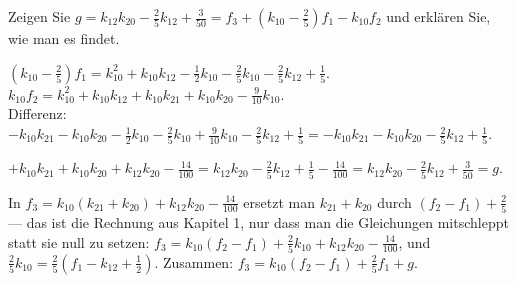 \begin{aufgabe}
Zeigen Sie $g = k_{12}k_{20} - \tfrac25k_{12} + \tfrac{3}{50} = f_3 + (k_{10} - \tfrac25)f_1 - k_{10}f_2$ und erklären Sie, wie man es findet.

\loesung
{}
$(k_{10} - \tfrac25)f_1 = k_{10}^{2} + k_{10}k_{12} - \tfrac12k_{10} - \tfrac25k_{10} - \tfrac25k_{12} + \tfrac15$.\\
$k_{10}f_2 = k_{10}^{2} + k_{10}k_{12} + k_{10}k_{21} + k_{10}k_{20} - \tfrac{9}{10}k_{10}$.\\
Differenz: $-k_{10}k_{21} - k_{10}k_{20} - \tfrac12k_{10} - \tfrac25k_{10} + \tfrac{9}{10}k_{10} - \tfrac25k_{12} + \tfrac15 = -k_{10}k_{21} - k_{10}k_{20} - \tfrac25k_{12} + \tfrac15$.

$+ k_{10}k_{21} + k_{10}k_{20} + k_{12}k_{20} - \tfrac{14}{100} = k_{12}k_{20} - \tfrac25k_{12} + \tfrac15 - \tfrac{14}{100} = k_{12}k_{20} - \tfrac25k_{12} + \tfrac{3}{50} = g$. \checkmark

In $f_3 = k_{10}(k_{21} + k_{20}) + k_{12}k_{20} - \tfrac{14}{100}$ ersetzt man $k_{21} + k_{20}$ durch $(f_2 - f_1) + \tfrac25$ --- das ist die Rechnung aus Kapitel 1, nur dass man die Gleichungen mitschleppt statt sie null zu setzen: $f_3 = k_{10}(f_2 - f_1) + \tfrac25k_{10} + k_{12}k_{20} - \tfrac{14}{100}$, und $\tfrac25k_{10} = \tfrac25(f_1 - k_{12} + \tfrac12)$. Zusammen: $f_3 = k_{10}(f_2 - f_1) + \tfrac25f_1 + g$.

\begin{center}
\begin{minipage}{0.88\textwidth}
\end{minipage}
\end{center}
\end{aufgabe}

